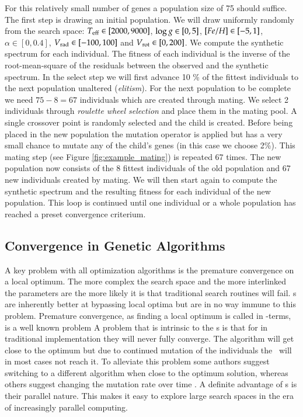 For this relatively small number of genes a population size of 75 should suffice. The first step is drawing an initial population. We will draw uniformly randomly from the search space: $T_{\rm eff} \in [2000, 9000]$, $\log{g} \in [0, 5]$, $[Fe/H] \in [-5,1]$, $\alpha \in [0,0.4]$, $\hbox{$V_{\textrm{rad}}$} \in [-100, 100]$ and $\hbox{$V_{\textrm{rot}}$} \in [0,200]$. We compute the synthetic spectrum for each individual. The fitness of each individual is the inverse of the root-mean-square of the residuals between the observed and the synthetic spectrum. 
In the select step we will first advance 10 \% of the fittest individuals to the next population unaltered (\textit{elitism}). For the next population to be complete we need $75 - 8 = 67$ individuals which are created through mating. We select 2 individuals through \textit{roulette wheel selection} and place them in the mating pool. A single crossover point is randomly selected and the child is created. Before being placed in the new population the mutation operator is applied but has a very small chance to mutate any of the child's genes (in this case we choose 2\%).
This mating step (see Figure \ref{fig:example_mating}) is repeated 67 times. The new population now consists of the 8 fittest individuals of the old population and 67 new individuals created by mating. We will then start again to compute the synthetic spectrum and the resulting fitness for each individual of the new population. This loop is continued until one individual or a whole population has reached a preset convergence criterium.

\subsection{Convergence in Genetic Algorithms}
A key problem with all optimization algorithms is the premature convergence on a local optimum. The more complex the search space and the more interlinked the parameters are the more likely it is that traditional search routines will fail. \ga s are inherently better at bypassing local optima but are in no way immune to this problem. Premature convergence, as finding a local optimum is called in \ga-terms, is a well known problem 
A problem that is intrinsic to the \ga s is that for in traditional implementation they will never fully converge. The algorithm will get close to the optimum but due to continued mutation of the individuals the \ga\ will in most cases not reach it. To alleviate this problem some authors suggest switching to a different algorithm when close to the optimum solution, whereas others suggest changing the mutation rate over time \citep[see][and references therein]{citeulike:344183}.
A definite advantage of \ga s is their parallel nature. This makes it easy to explore large search spaces in the era of increasingly parallel computing. 

